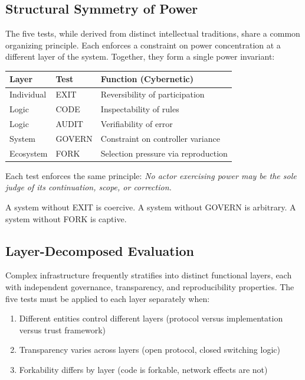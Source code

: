 \subsection{Structural Symmetry of Power}

The five tests, while derived from distinct intellectual traditions, share a common organizing principle. Each enforces a constraint on power concentration at a different layer of the system. Together, they form a single power invariant:

\begin{center}
\begin{tabular}{@{}lll@{}}
\toprule
\textbf{Layer} & \textbf{Test} & \textbf{Function (Cybernetic)} \\
\midrule
Individual & EXIT & Reversibility of participation \\
Logic & CODE & Inspectability of rules \\
Logic & AUDIT & Verifiability of error \\
System & GOVERN & Constraint on controller variance \\
Ecosystem & FORK & Selection pressure via reproduction \\
\bottomrule
\end{tabular}
\end{center}

Each test enforces the same principle: \textit{No actor exercising power may be the sole judge of its continuation, scope, or correction.}

A system without EXIT is coercive. A system without GOVERN is arbitrary. A system without FORK is captive.

\subsection{Layer-Decomposed Evaluation}
\label{subsec:layers}

Complex infrastructure frequently stratifies into distinct functional layers, each with independent governance, transparency, and reproducibility properties. The five tests must be applied to each layer separately when:

\begin{enumerate}[noitemsep,topsep=0pt]
    \item Different entities control different layers (protocol versus implementation versus trust framework)
    \item Transparency varies across layers (open protocol, closed switching logic)
    \item Forkability differs by layer (code is forkable, network effects are not)
\end{enumerate}

